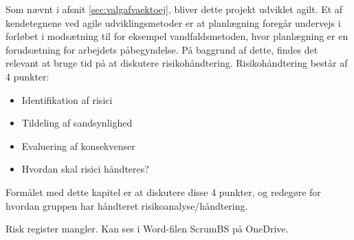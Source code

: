Som nævnt i afsnit \ref{sec:valgafvaektoej}, bliver dette projekt udviklet agilt. Et af kendetegnene ved agile udviklingsmetoder er at 
planlægning foregår undervejs i forløbet i modsætning til for eksempel vandfaldsmetoden, hvor planlægning er en 
forudsætning for arbejdets påbegyndelse. På baggrund af dette, findes det relevant at bruge tid på at diskutere 
risikohåndtering. Risikohåndtering består af 4 punkter:

\begin{itemize}
    \item Identifikation af risici
    \item Tildeling af sandsynlighed
    \item Evaluering af konsekvenser
    \item Hvordan skal risici håndteres?
\end{itemize}

Formålet med dette kapitel er at diskutere disse 4 punkter, og redegøre for hvordan gruppen har håndteret risikoanalyse/håndtering.

Risk register mangler. Kan ses i Word-filen ScrumBS på OneDrive.